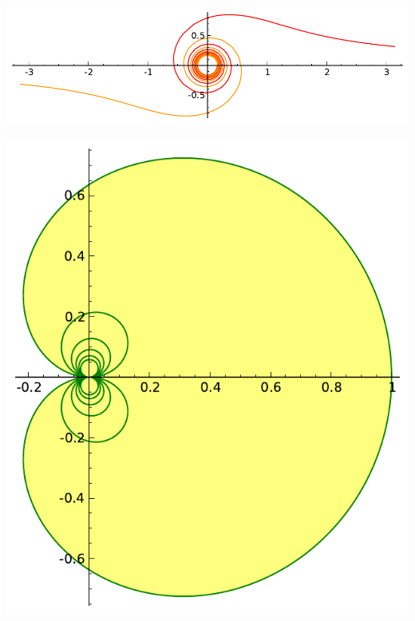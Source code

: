 \documentclass[class=report,crop=false]{standalone}
\begin{document}
\begin{center}
  \begin{minipage}{0.49\textwidth}
\includegraphics[scale=0.5]{figures/lituus}  
\end{minipage}
\begin{minipage}{0.49\textwidth}
\qquad\qquad\includegraphics[scale=0.5]{figures/cochleoid}  
\end{minipage}
\end{center}






\end{document}
